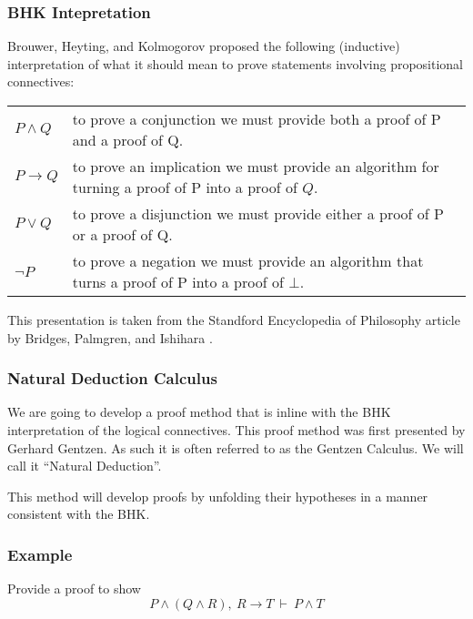 \documentclass{beamer}
\begin{document}
\begin{frame}
  \frametitle{BHK Intepretation}
  Brouwer, Heyting, and Kolmogorov proposed the following (inductive) interpretation of what it should mean to prove statements involving propositional connectives:

  \vspace{0.5cm}

  \begin{center}
    \begin{tabular}{p{1.5cm}p{8cm}}
      $P \land Q$ & to prove a conjunction we must provide both a proof of P and a proof of Q. \\      
      $P \to Q$ & to prove an implication we must provide an algorithm for turning a proof of P into a proof of $Q$.\\
      $P \lor Q$ & to prove a disjunction we must provide either a proof of P or a proof of Q. \\
      $\lnot P$ &  to prove a negation we must provide an algorithm that turns a proof of P into a proof of $\bot$.
    \end{tabular}
  \end{center}

  \vspace{0.5cm}

  This presentation is taken from the Standford Encyclopedia of Philosophy article by Bridges, Palmgren, and Ishihara \cite{sep-mathematics-constructive}.
\end{frame}

\begin{frame}
  \frametitle{Natural Deduction Calculus}

  We are going to develop a proof method that is inline with the BHK interpretation of the logical connectives. This proof method was first presented by Gerhard Gentzen. As such it is often referred to as the Gentzen Calculus. We will call it ``Natural Deduction''.

  \vspace{0.5cm}

  This method will develop proofs by unfolding their hypotheses in a manner consistent with the BHK.
\end{frame}

\begin{frame}
	\frametitle{Example}
	Provide a proof to show $$P \land (Q \land R), \ R \to T  \ \vdash \ P \land T$$


	\vspace{6cm}
	
\end{frame}
\end{document}
